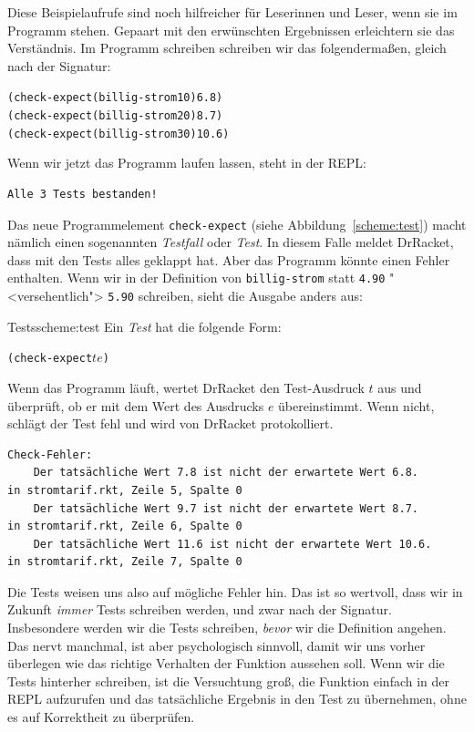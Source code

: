 Diese Beispielaufrufe sind noch hilfreicher für Leserinnen und Leser,
wenn sie im Programm stehen.  Gepaart mit den erwünschten Ergebnissen
erleichtern sie das Verständnis.  Im Programm schreiben schreiben wir
das folgendermaßen, gleich nach der Signatur:
%
\begin{alltt}
(check-expect (billig-strom 10) 6.8)
(check-expect (billig-strom 20) 8.7)
(check-expect (billig-strom 30) 10.6)
\end{alltt}
%
Wenn wir jetzt das Programm laufen lassen, steht in der REPL:
%
\begin{verbatim}
Alle 3 Tests bestanden!
\end{verbatim}
%
Das neue Programmelement
\texttt{check-expect} (siehe
Abbildung~\ref{scheme:test}) macht
nämlich einen sogenannten \textit{Testfall} oder \textit{Test}.  In diesem Falle
meldet DrRacket, dass mit den Tests alles geklappt hat.  Aber das
Programm könnte einen Fehler enthalten.  Wenn wir in der Definition
von \texttt{billig-strom} statt \texttt{4.90} "<versehentlich">
\texttt{5.90} schreiben, sieht die Ausgabe anders aus:
%
\begin{feature}{Tests}{scheme:test}
  Ein \textit{Test} hat die folgende Form:
\begin{alltt}
(check-expect \(t\) \(e\))
\end{alltt}
%
Wenn das Programm läuft, wertet DrRacket den Test-Ausdruck $t$ aus und
überprüft, ob er mit dem Wert des Ausdrucks $e$ übereinstimmt.  Wenn
nicht, schlägt der Test fehl und wird von DrRacket protokolliert.
\end{feature}
%
\begin{verbatim}
Check-Fehler:
	Der tatsächliche Wert 7.8 ist nicht der erwartete Wert 6.8.
in stromtarif.rkt, Zeile 5, Spalte 0 
	Der tatsächliche Wert 9.7 ist nicht der erwartete Wert 8.7.
in stromtarif.rkt, Zeile 6, Spalte 0 
	Der tatsächliche Wert 11.6 ist nicht der erwartete Wert 10.6.
in stromtarif.rkt, Zeile 7, Spalte 0 
\end{verbatim}
%
Die Tests weisen uns also auf mögliche Fehler hin.  Das ist so
wertvoll, dass wir in Zukunft \emph{immer} Tests schreiben werden, und
zwar nach der Signatur.  Insbesondere werden wir die Tests schreiben,
\emph{bevor} wir die Definition angehen.  Das nervt manchmal, ist aber
psychologisch sinnvoll, damit wir uns vorher überlegen wie das
richtige Verhalten der Funktion aussehen soll.  Wenn wir die Tests
hinterher schreiben, ist die Versuchtung groß, die Funktion einfach in
der REPL aufzurufen und das tatsächliche Ergebnis in den Test zu
übernehmen, ohne es auf Korrektheit zu überprüfen.


